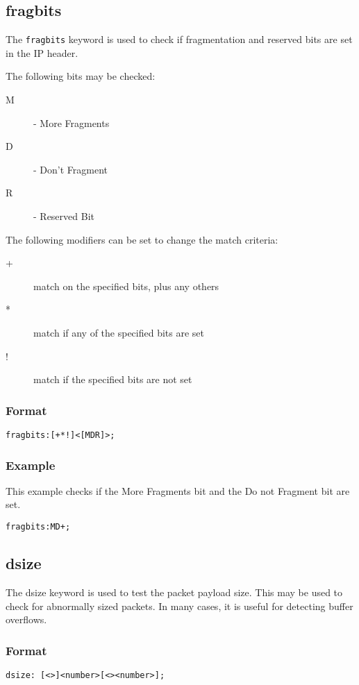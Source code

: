 \documentclass[english]{report}
\begin{document}
\subsection{fragbits}

The \texttt{fragbits} keyword is used to check if fragmentation and reserved bits are set in the IP header.

The following bits may be checked:
\begin{description}
\item [M] - More Fragments
\item [D] - Don't Fragment
\item [R] - Reserved Bit
\end{description}

The following modifiers can be set to change the match criteria:
\begin{description}
\item [+] match on the specified bits, plus any others
\item [*] match if any of the specified bits are set
\item [!] match if the specified bits are not set
\end{description}

\subsubsection{Format}

\begin{verbatim}
fragbits:[+*!]<[MDR]>;
\end{verbatim}

\subsubsection{Example}

This example checks if the More Fragments bit and the Do not Fragment bit are
set.
\begin{verbatim}
fragbits:MD+;
\end{verbatim}

\subsection{dsize}

The dsize keyword is used to test the packet payload size.  This may be used to check for abnormally sized packets.  In many cases, it is useful for detecting buffer overflows.

\subsubsection{Format}
\begin{verbatim}
dsize: [<>]<number>[<><number>];
\end{verbatim}
\end{document}
